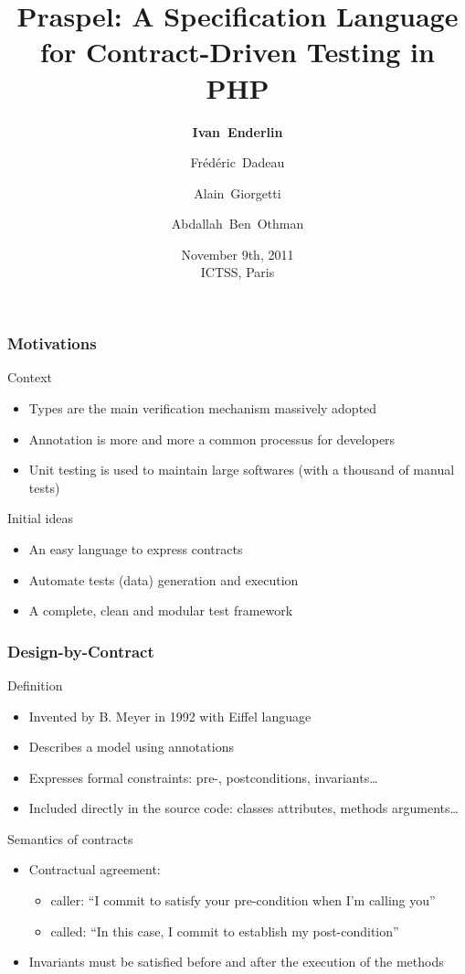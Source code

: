 \documentclass[10pt]{beamer}
\title[Praspel: Contract-Driven Testing for PHP]{Praspel: A Specification Language for Contract-Driven Testing in PHP}
\author{
    \textbf{Ivan~Enderlin} \and
    Frédéric~Dadeau \and
    Alain~Giorgetti \and
    Abdallah~Ben~Othman
}
\date{
    November 9th, 2011 \\
    ICTSS, Paris
}
\begin{document}
\maketitle

\begin{frame}
\frametitle{Motivations}

\begin{block}{Context}
\begin{itemize}
\item Types are the main verification mechanism massively adopted
\item Annotation is more and more a common processus for developers
\item Unit testing is used to maintain large softwares (with a thousand of
manual tests)
\end{itemize}
\end{block}

\begin{block}{Initial ideas}
\begin{itemize}
\item An easy language to express contracts
\item Automate tests (data) generation and execution
\item A complete, clean and modular test framework
\end{itemize}
\end{block}

\end{frame}

\begin{frame}
\frametitle{Design-by-Contract}

\begin{block}{Definition}
\begin{itemize}
\item Invented by B. Meyer in 1992 with Eiffel language
\item Describes a model using annotations
\item Expresses formal constraints: pre-, postconditions, invariants…
\item Included directly in the source code: classes attributes, methods
arguments…
\end{itemize}
\end{block}

\begin{block}{Semantics of contracts}
\begin{itemize}
\item Contractual agreement:
  \begin{itemize}
  \item caller: “I commit to satisfy your pre-condition when I'm calling you”
  \item called: “In this case, I commit to establish my post-condition”
  \end{itemize}
\item Invariants must be satisfied before and after the execution of the methods
\end{itemize}
\end{block}

\end{frame}
\end{document}
